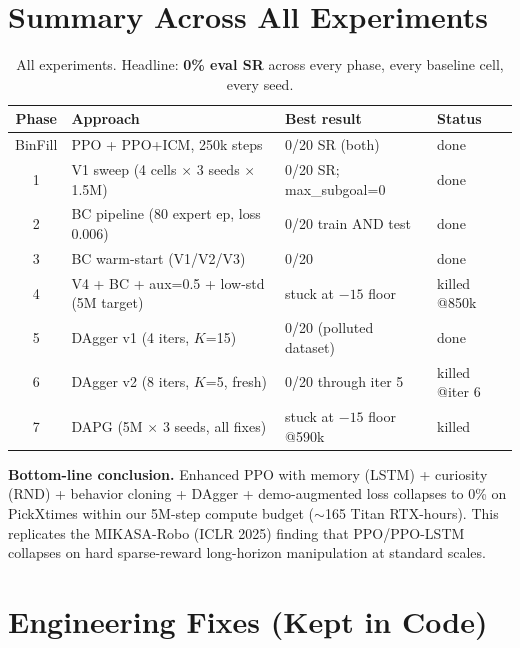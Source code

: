 \documentclass[11pt,letterpaper]{article}
\begin{document}
\section{Summary Across All Experiments}
\label{sec:summary}

\begin{table}[H]
\centering
\renewcommand{\arraystretch}{1.15}
\begin{tabular}{clll}
\toprule
\textbf{Phase} & \textbf{Approach} & \textbf{Best result} & \textbf{Status} \\
\midrule
BinFill & PPO + PPO+ICM, 250k steps & 0/20 SR (both) & done \\
\midrule
1 & V1 sweep (4 cells $\times$ 3 seeds $\times$ 1.5M) & 0/20 SR; max\_subgoal=0 & done \\
2 & BC pipeline (80 expert ep, loss 0.006) & 0/20 train AND test & done \\
3 & BC warm-start (V1/V2/V3) & 0/20 & done \\
4 & V4 + BC + aux=0.5 + low-std (5M target) & stuck at $-15$ floor & killed @850k \\
5 & DAgger v1 (4 iters, $K$=15) & 0/20 (polluted dataset) & done \\
6 & DAgger v2 (8 iters, $K$=5, fresh) & 0/20 through iter 5 & killed @iter 6 \\
7 & DAPG (5M $\times$ 3 seeds, all fixes) & stuck at $-15$ floor @590k & killed \\
\bottomrule
\end{tabular}
\caption{All experiments. Headline: \textbf{0\% eval SR} across every phase,
every baseline cell, every seed.}
\end{table}

\begin{finding}
\textbf{Bottom-line conclusion.}
Enhanced PPO with memory (LSTM) + curiosity (RND) + behavior cloning + DAgger
+ demo-augmented loss collapses to 0\% on PickXtimes within our 5M-step compute
budget ($\sim$165 Titan RTX-hours). This replicates the MIKASA-Robo (ICLR 2025)
finding that PPO/PPO-LSTM collapses on hard sparse-reward long-horizon manipulation
at standard scales.
\end{finding}

\section{Engineering Fixes (Kept in Code)}
\label{sec:engineering}
\end{document}
